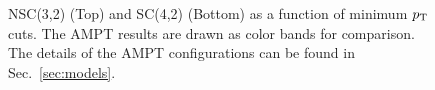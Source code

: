 \documentclass[ALICE,manyauthors]{cernphprep}
\begin{document}
\begin{figure}[htbp]
             \begin{center}
              \end{center}
             \caption{NSC(3,2) (Top) and SC(4,2) (Bottom) as a function of minimum $p_{\rm T}$ cuts. The AMPT results are drawn as color bands for comparison. The details of the AMPT configurations can be found in Sec.~\ref{sec:models}.}
             \label{fig:Figure_8}
\end{figure}

\pagebreak
 
\end{document}
